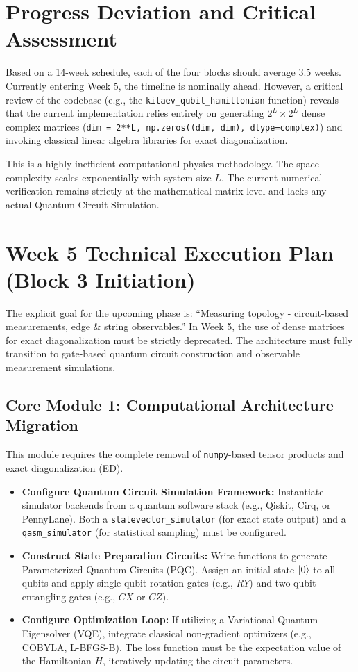 \documentclass[12pt, a4paper]{article}
\begin{document}
\section{Progress Deviation and Critical Assessment}
Based on a 14-week schedule, each of the four blocks should average 3.5 weeks. Currently entering Week 5, the timeline is nominally ahead. However, a critical review of the codebase (e.g., the \texttt{kitaev\_qubit\_hamiltonian} function) reveals that the current implementation relies entirely on generating $2^L \times 2^L$ dense complex matrices (\texttt{dim = 2**L, np.zeros((dim, dim), dtype=complex)}) and invoking classical linear algebra libraries for exact diagonalization. 

This is a highly inefficient computational physics methodology. The space complexity scales exponentially with system size $L$. The current numerical verification remains strictly at the mathematical matrix level and lacks any actual Quantum Circuit Simulation.

\section{Week 5 Technical Execution Plan (Block 3 Initiation)}
The explicit goal for the upcoming phase is: ``Measuring topology - circuit-based measurements, edge \& string observables.'' In Week 5, the use of dense matrices for exact diagonalization must be strictly deprecated. The architecture must fully transition to gate-based quantum circuit construction and observable measurement simulations.

\subsection{Core Module 1: Computational Architecture Migration}
This module requires the complete removal of \texttt{numpy}-based tensor products and exact diagonalization (ED).
\begin{itemize}
    \item \textbf{Configure Quantum Circuit Simulation Framework:} Instantiate simulator backends from a quantum software stack (e.g., Qiskit, Cirq, or PennyLane). Both a \texttt{statevector\_simulator} (for exact state output) and a \texttt{qasm\_simulator} (for statistical sampling) must be configured.
    \item \textbf{Construct State Preparation Circuits:} Write functions to generate Parameterized Quantum Circuits (PQC). Assign an initial state $\ket{0}$ to all qubits and apply single-qubit rotation gates (e.g., $RY$) and two-qubit entangling gates (e.g., $CX$ or $CZ$).
    \item \textbf{Configure Optimization Loop:} If utilizing a Variational Quantum Eigensolver (VQE), integrate classical non-gradient optimizers (e.g., COBYLA, L-BFGS-B). The loss function must be the expectation value of the Hamiltonian $H$, iteratively updating the circuit parameters.
\end{itemize}
\end{document}
